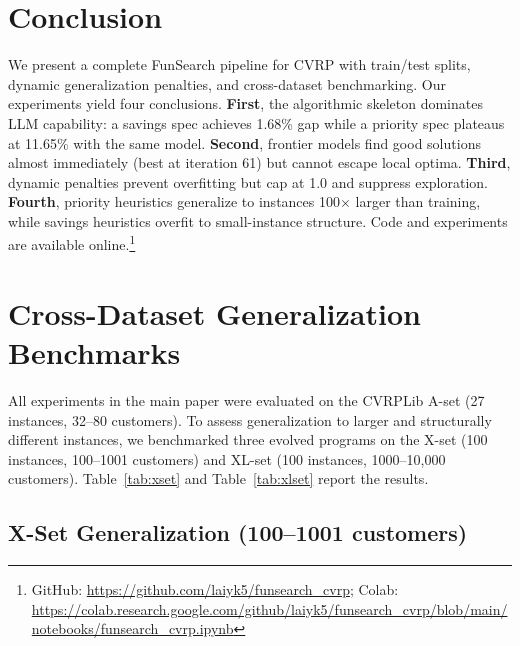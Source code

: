 \documentclass{article}
\begin{document}
\vspace{-4pt}
\section{Conclusion}
\vspace{-4pt}

We present a complete FunSearch pipeline for CVRP with train/test splits, dynamic generalization penalties, and cross-dataset benchmarking. Our experiments yield four conclusions. \textbf{First}, the algorithmic skeleton dominates LLM capability: a savings spec achieves 1.68\% gap while a priority spec plateaus at 11.65\% with the same model. \textbf{Second}, frontier models find good solutions almost immediately (best at iteration 61) but cannot escape local optima. \textbf{Third}, dynamic penalties prevent overfitting but cap at 1.0 and suppress exploration. \textbf{Fourth}, priority heuristics generalize to instances 100$\times$ larger than training, while savings heuristics overfit to small-instance structure. Code and experiments are available online.\footnote{GitHub: \url{https://github.com/laiyk5/funsearch_cvrp}; Colab: \url{https://colab.research.google.com/github/laiyk5/funsearch_cvrp/blob/main/notebooks/funsearch_cvrp.ipynb}}




\newpage
\appendix

\section{Cross-Dataset Generalization Benchmarks}
\label{app:generalization}

All experiments in the main paper were evaluated on the CVRPLib A-set (27 instances, 32--80 customers). To assess generalization to larger and structurally different instances, we benchmarked three evolved programs on the X-set (100 instances, 100--1001 customers) and XL-set (100 instances, 1000--10,000 customers). Table~\ref{tab:xset} and Table~\ref{tab:xlset} report the results.

\subsection{X-Set Generalization (100--1001 customers)}
\end{document}

